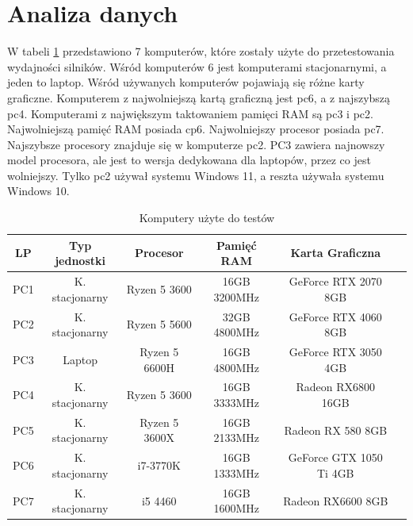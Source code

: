 \documentclass[12pt,twoside]{article}
\begin{document}
\clearpage
\section{Analiza danych}

W tabeli \ref{Tabela:KomputeryTesty} przedstawiono 7 komputerów, które zostały
użyte do przetestowania wydajności silników. Wśród komputerów 6 jest komputerami
stacjonarnymi, a jeden to laptop. Wśród używanych komputerów pojawiają się różne
karty graficzne. Komputerem z najwolniejszą kartą graficzną jest pc6, a z
najszybszą pc4. Komputerami z największym taktowaniem pamięci RAM są pc3
i pc2. Najwolniejszą pamięć RAM posiada cp6. Najwolniejszy procesor posiada pc7.
Najszybsze procesory znajduje się w komputerze pc2. PC3 zawiera najnowszy model
procesora, ale jest to wersja dedykowana dla laptopów, przez co jest wolniejszy.
Tylko pc2 używał systemu Windows 11, a reszta używała systemu Windows 10.  

\begin{table}[ht]
    \caption{Komputery użyte do testów}
    \centering		
        \begin{tabular}{|c|c|c|c|c|c|}	
            \hline
            LP & Typ jednostki & Procesor & Pamięć RAM & Karta Graficzna  \\
            \hline
            PC1 & K. stacjonarny & Ryzen 5 3600 & 16GB 3200MHz & GeForce RTX 2070 8GB\\
            \hline
            PC2 & K. stacjonarny & Ryzen 5 5600 & 32GB 4800MHz & GeForce RTX 4060 8GB  \\
            \hline
            PC3 & Laptop & Ryzen 5 6600H & 16GB 4800MHz & GeForce RTX 3050 4GB  \\
            \hline
            PC4 & K. stacjonarny & Ryzen 5 3600 & 16GB 3333MHz & Radeon RX6800 16GB \\
            \hline
            PC5 & K. stacjonarny & Ryzen 5 3600X & 16GB 2133MHz & Radeon RX 580 8GB\\
            \hline
            PC6 & K. stacjonarny & i7-3770K & 16GB 1333MHz & GeForce GTX 1050 Ti 4GB \\
            \hline
            PC7 & K. stacjonarny & i5 4460 & 16GB 1600MHz & Radeon RX6600 8GB \\
            \hline

        \end{tabular}	
    \label{Tabela:KomputeryTesty}
\end{table}	
\end{document}
